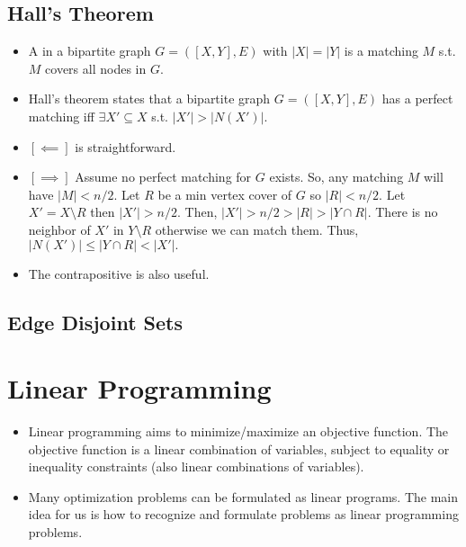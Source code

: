 \documentclass[a4paper,12pt]{article}
\begin{document}
\subsection{Hall's Theorem}
\begin{itemize}
    \item A  in a bipartite graph $G=([X,Y],E)$ with $|X|=|Y|$ is a matching $M$ s.t. $M$ covers all nodes in $G.$
    \item Hall's theorem states that a bipartite graph $G=([X,Y],E)$ has a perfect matching iff $\exists X'\subseteq X$ s.t. $|X'|>|N(X')|.$
    \item $[\impliedby]$ is straightforward.
    \item $[\implies]$ Assume no perfect matching for $G$ exists. So, any matching $M$ will have $|M|<n/2.$ Let $R$ be a min vertex cover of $G$ so $|R|<n/2.$ Let $X'=X\setminus R$ then $|X'|>n/2.$ Then, $|X'|>n/2>|R|>|Y\cap R|.$ There is no neighbor of $X'$ in $Y\setminus R$ otherwise we can match them. Thus, $|N(X')|\leq|Y\cap R|<|X'|.$
    \item The contrapositive is also useful.
\end{itemize}
\subsection{Edge Disjoint Sets}

\section{Linear Programming}
\begin{itemize}
    \item Linear programming aims to minimize/maximize an objective function. The objective function is a linear combination of variables, subject to equality or inequality constraints (also linear combinations of variables).
    \item Many optimization problems can be formulated as linear programs. The main idea for us is how to recognize and formulate problems as linear programming problems.
\end{itemize}
\end{document}
